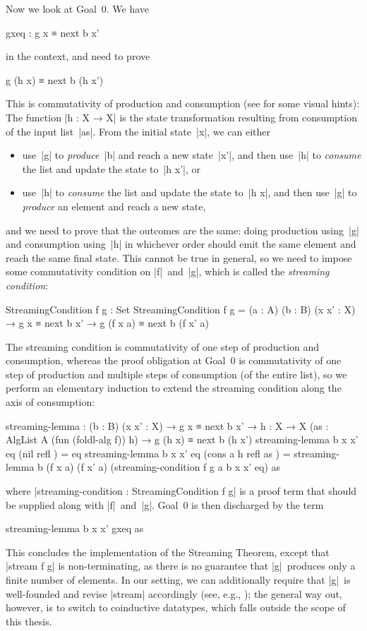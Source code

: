 Now we look at Goal~0.
We have
\begin{code}
gxeq : g x ≡ next b x'
\end{code}
in the context, and need to prove
\begin{code}
g (h x) ≡ next b (h x')
\end{code}
This is commutativity of production and consumption (see \citet[Figures 1~and~2]{Gibbons-metamorphisms} for some visual hints):
The function |h : X → X| is the state transformation resulting from consumption of the input list~|as|.
From the initial state~|x|, we can either
\begin{itemize}
\item use~|g| to \emph{produce}~|b| and reach a new state~|x'|, and then use~|h| to \emph{consume} the list and update the state to~|h x'|, or
\item use~|h| to \emph{consume} the list and update the state to~|h x|, and then use~|g| to \emph{produce} an element and reach a new state,
\end{itemize}
and we need to prove that the outcomes are the same: doing production using~|g| and consumption using~|h| in whichever order should emit the same element and reach the same final state.
This cannot be true in general, so we need to impose some commutativity condition on |f|~and~|g|, which is called the \emph{streaming condition}:
\begin{code}
StreamingCondition f g : Set
StreamingCondition f g =
  (a : A) (b : B) (x x' : X) → g x ≡ next b x' → g (f x a) ≡ next b (f x' a)
\end{code}
The streaming condition is commutativity of one step of production and consumption, whereas the proof obligation at Goal~0 is commutativity of one step of production and multiple steps of consumption (of the entire list), so we perform an elementary induction to extend the streaming condition along the axis of consumption:
\begin{code}
streaming-lemma :
  (b : B) (x x' : X) → g x ≡ next b x' →
  {h : X → X} (as : AlgList A (fun (foldl-alg f)) h) → g (h x) ≡ next b (h x')
streaming-lemma b x x' eq (nil       refl     ) = eq
streaming-lemma b x x' eq (cons a h  refl as  ) =
  streaming-lemma b (f x a) (f x' a) (streaming-condition f g a b x x' eq) as
\end{code}
where |streaming-condition : StreamingCondition f g| is a proof term that should be supplied along with |f|~and~|g|.
Goal~0 is then discharged by the term
\begin{code}
streaming-lemma b x x' gxeq as
\end{code}
This concludes the implementation of the Streaming Theorem, except that |stream f g| is non-terminating, as there is no guarantee that |g|~produces only a finite number of elements.
In our setting, we can additionally require that |g|~is well-founded and revise |stream| accordingly (see, e.g., \citet{Nordstrom-accessibility}); the general way out, however, is to switch to coinductive datatypes, which falls outside the scope of this thesis.

